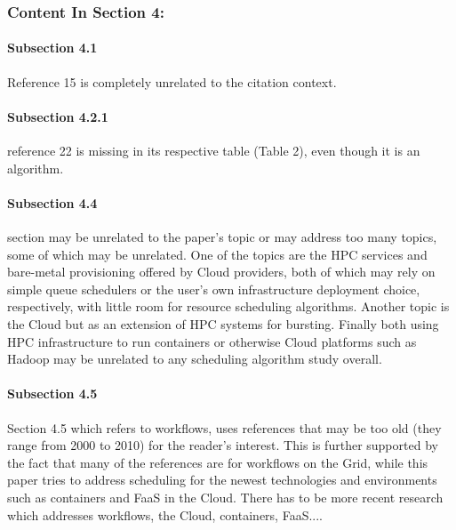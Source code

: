\subsubsection{Content In Section 4:}

\paragraph{Subsection 4.1}

Reference 15 is completely unrelated to the citation context.


\paragraph{Subsection 4.2.1}

reference 22 is missing in its respective table
(Table 2), even though it is an algorithm.


\paragraph{Subsection 4.4}

section may be unrelated to the paper's topic or may address
too many topics, some of which may be unrelated. One of the topics are
the HPC services and bare-metal provisioning offered by Cloud
providers, both of which may rely on simple queue schedulers or the
user's own infrastructure deployment choice, respectively, with little
room for resource scheduling algorithms. Another topic is the Cloud
but as an extension of HPC systems for bursting. Finally both using
HPC infrastructure to run containers or otherwise Cloud platforms such
as Hadoop may be unrelated to any scheduling algorithm study overall.


\paragraph{Subsection 4.5}

Section 4.5 which refers to workflows, uses references that may
be too old (they range from 2000 to 2010) for the reader's interest.
This is further supported by the fact that many of the references are
for workflows on the Grid, while this paper tries to address
scheduling for the newest technologies and environments such as
containers and FaaS in the Cloud. There has to be more recent research
which addresses workflows, the Cloud, containers, FaaS....

